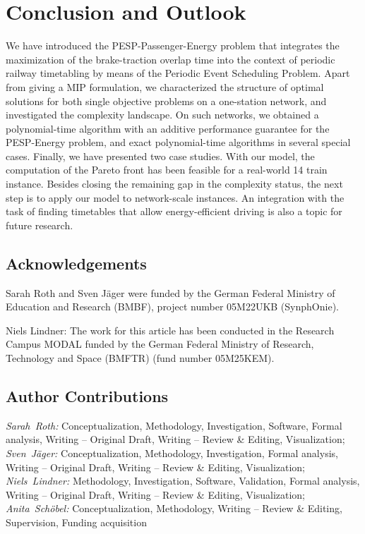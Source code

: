 \documentclass[11pt,a4paper]{article}
\newcommand{\pespenergy}{PESP-Energy\xspace}
\newcommand{\pesppassenergy}{PESP-Passenger-Energy\xspace}
\newcommand{\osn}{one-station network\xspace}
\theoremstyle{definition}
\theoremstyle{remark}
\begin{document}
\section{Conclusion and Outlook} \label{sec:outlook}
We have introduced the \pesppassenergy problem that integrates the maximization of the brake-traction overlap time into the context of periodic railway timetabling by means of the Periodic Event Scheduling Problem. Apart from giving a MIP formulation, we characterized the structure of optimal solutions for both single objective problems on a \osn, and investigated the complexity landscape. On such networks, we obtained a polynomial-time algorithm with an additive performance guarantee for the \pespenergy problem, and exact polynomial-time algorithms in several special cases. Finally, we have presented two case studies. With our model, the computation of the Pareto front has been feasible for a real-world 14 train instance. Besides closing the remaining gap in the complexity status, the next step is to apply our model to network-scale instances. An integration with the task of finding timetables that allow energy-efficient driving is also a topic for future research.

\subsection*{Acknowledgements}

Sarah Roth and Sven Jäger were funded by the German Federal Ministry of Education and Research (BMBF), project number 05M22UKB (SynphOnie).

Niels Lindner: The work for this article has been conducted in the Research Campus MODAL funded by the German Federal Ministry of Research, Technology and Space (BMFTR) (fund number 05M25KEM).

\subsection*{Author Contributions}

\textit{Sarah~Roth:} Conceptualization, Methodology, Investigation, Software, Formal analysis, Writing -- Original Draft, Writing -- Review \& Editing, Visualization;
\textit{Sven~Jäger:} Conceptualization, Methodology, Investigation, Formal analysis, Writing -- Original Draft, Writing -- Review \& Editing, Visualization;
\textit{Niels~Lindner:} Methodology, Investigation, Software, Validation, Formal analysis, Writing -- Original Draft, Writing -- Review \& Editing, Visualization;
\textit{Anita~Schöbel:} Conceptualization, Methodology, Writing -- Review \& Editing, Supervision, Funding acquisition
\end{document}
